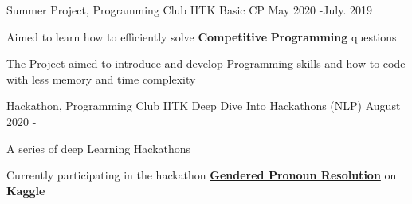 \begin{cventries}
  
  \cventry
    {Summer Project, Programming Club IITK} %
    {Basic CP} %
    {\hspace{-5em} } %
    {May 2020 -July. 2019} %
    {
      \begin{cvitems} %
        \item Aimed to learn how to efficiently solve \textbf{Competitive} \textbf{Programming} questions
        \item The Project aimed to introduce and develop Programming skills and how to code with less memory and time complexity
      \end{cvitems}
    }

\cventry
    {Hackathon, Programming Club IITK} %
    {Deep Dive Into Hackathons (NLP)} %
    {\hspace{-5em} } %
    {August 2020 - } %
    {
      \begin{cvitems} %
        \item A series of deep Learning Hackathons
        \item Currently participating in the hackathon \textbf{\href{https://www.kaggle.com/c/gendered-pronoun-resolution}{Gendered Pronoun Resolution}} on \textbf{Kaggle}
      \end{cvitems}
    }
    

\end{cventries}
